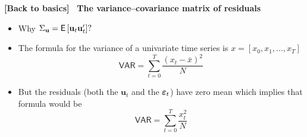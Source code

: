 \documentclass[10pt,handout]{beamer}
\begin{document}
\begin{frame}
{{\footnotesize \textbf{[Back to basics]}} \textbf{\ {The
variance--covariance matrix of residuals} }}

\begin{itemize}
\item Why $\Sigma _{\mathbf{u}}=\mathsf{E}\left[ \mathbf{u}_{t}\mathbf{u}%
_{t}^{\prime }\right] ?\medskip $

\item The formula for the variance of a univariate time series is $%
x=[x_{0},x_{1},...,x_{T}]$%
\begin{equation*}
\mathsf{VAR}=\sum_{t=0}^{T}\frac{\left( x_{t}-\bar{x}\right) ^{2}}{N}
\end{equation*}

\item But the residuals (both the $\mathbf{u}_{t}$ and the $\mathbf{%
\varepsilon }_{t}$) have zero mean which implies that formula would be 
\begin{equation*}
\mathsf{VAR}=\sum_{t=0}^{T}\frac{x_{t}^{2}}{N}
\end{equation*}
\end{itemize}
\end{frame}

\everymath\expandafter{\the\everymath \color{title!80}}
\everydisplay\expandafter{\the\everydisplay \color{title!80}}%

\vspace{0.1cm}
\end{document}
